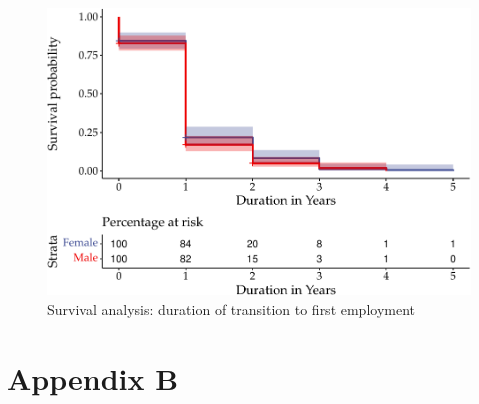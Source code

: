 \documentclass[
  11pt,
a4paper
]{article}
\begin{document}
\begin{figure}
\includegraphics{figures/fig-survival-1} \caption{Survival analysis: duration of transition to first employment}\label{fig:fig-survival}
\end{figure}

\newpage

\hypertarget{survey-appendix-b}{%
\section*{Appendix B}\label{survey-appendix-b}}

\setcounter{table}{0}
\renewcommand{\thetable}{B\arabic{table}}

\providecommand{\docline}[3]{\noalign{\global\setlength{\arrayrulewidth}{#1}}\arrayrulecolor[HTML]{#2}\cline{#3}}

\setlength{\tabcolsep}{0pt}

\renewcommand*{\arraystretch}{1.25}
\end{document}
